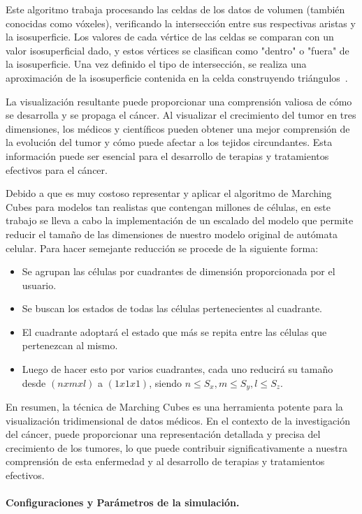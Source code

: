 \documentclass[a4paper,11pt]{article}
\begin{document}
{Este algoritmo trabaja procesando las celdas de los datos de volumen (también conocidas como vóxeles), verificando la intersección entre sus respectivas aristas y la isosuperficie. Los valores de cada vértice de las celdas se comparan con un valor isosuperficial dado, y estos vértices se clasifican como "dentro" o "fuera" de la isosuperficie. Una vez definido el tipo de intersección, se realiza una aproximación de la isosuperficie contenida en la celda construyendo triángulos~\cite{1}.

La visualización resultante puede proporcionar una comprensión valiosa de cómo se desarrolla y se propaga el cáncer. Al visualizar el crecimiento del tumor en tres dimensiones, los médicos y científicos pueden obtener una mejor comprensión de la evolución del tumor y cómo puede afectar a los tejidos circundantes. Esta información puede ser esencial para el desarrollo de terapias y tratamientos efectivos para el cáncer.

Debido a que es muy costoso representar y aplicar el algoritmo de Marching Cubes para modelos tan realistas que contengan millones de c\'elulas, en este trabajo se lleva a cabo la implementaci\'on de un escalado del modelo que permite reducir el tama\~no de las dimensiones de nuestro modelo original de aut\'omata celular. Para hacer semejante reducci\'on se procede de la siguiente forma:
\begin{itemize}
    \item Se agrupan las c\'elulas por cuadrantes de dimensi\'on proporcionada por el usuario.
    \item Se buscan los estados de todas las c\'elulas pertenecientes al cuadrante.
    \item El cuadrante adoptar\'a el estado que m\'as se repita entre las c\'elulas que pertenezcan al mismo.
    \item Luego de hacer esto por varios cuadrantes, cada uno reducir\'a su tama\~no desde $(n x m x l)$ a $(1 x 1 x 1)$, siendo $n \leq S_{x} ,m \leq S_{y},l \leq S_{z}$. 
\end{itemize}

En resumen, la técnica de Marching Cubes es una herramienta potente para la visualización tridimensional de datos médicos. En el contexto de la investigación del cáncer, puede proporcionar una representación detallada y precisa del crecimiento de los tumores, lo que puede contribuir significativamente a nuestra comprensión de esta enfermedad y al desarrollo de terapias y tratamientos efectivos.\\
\\
\textbf{Configuraciones y Par\'ametros de la simulaci\'on.}

}
\end{document}
